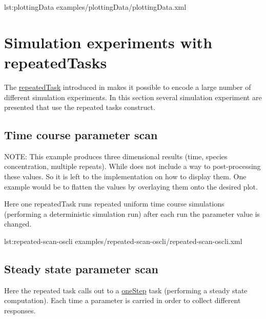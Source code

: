 
{lst:plottingData}
{examples/plottingData/plottingData.xml}


\section{Simulation experiments with repeatedTasks}
The \hyperref[class:repeatedTask]{repeatedTask} introduced in \LoneVtwo makes it possible to encode a large number of different simulation experiments. In this section several simulation experiment are presented that use the repeated tasks construct. 

\subsection{Time course parameter scan}
NOTE: This example produces three dimensional results (time, species concentration, multiple repeats). While \LoneVtwo does not include a way to post-processing these values. So it is left to the implementation on how to display them. One example would be to flatten the values by overlaying them onto the desired plot. 

Here one repeatedTask  runs repeated uniform time course simulations (performing a deterministic simulation run) after each run the parameter value is changed.


{lst:repeated-scan-oscli}
{examples/repeated-scan-oscli/repeated-scan-oscli.xml}


\subsection{Steady state parameter scan}
Here the repeated task calls out to a \hyperref[class:oneStep]{oneStep} task (performing a steady state computation). Each time a parameter is carried in order to collect different responses. 

